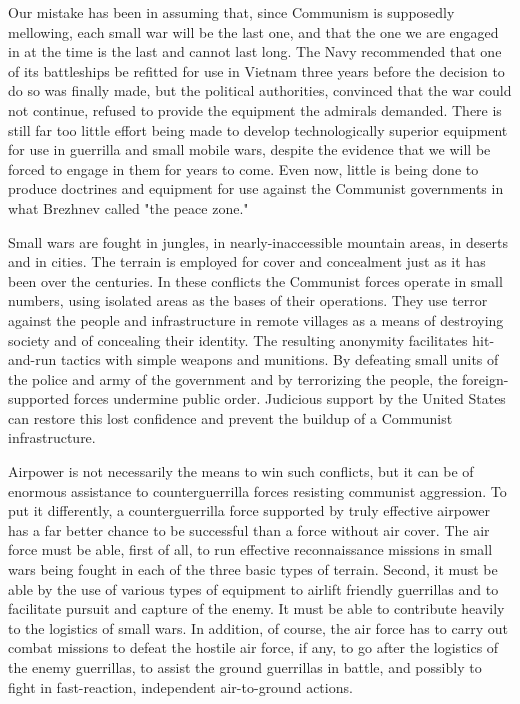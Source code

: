 Our mistake has been in assuming that, since Communism is supposedly mellowing, each small war will be the last one, and that the one we are engaged in at the time is the last and cannot last long. The Navy recommended that one of its battleships be refitted for use in Vietnam three years before the decision to do so was finally made, but the political authorities, convinced that the war could not continue, refused to provide the equipment the admirals demanded. There is still far too little effort being made to develop technologically superior equipment for use in guerrilla and small mobile wars, despite the evidence that we will be forced to engage in them for years to come. Even now, little is being done to produce doctrines and equipment for use against the Communist governments in what Brezhnev called "the peace zone."

Small wars are fought in jungles, in nearly-inaccessible mountain areas, in deserts and in cities. The terrain is employed for cover and concealment just as it has been over the centuries. In these conflicts the Communist forces operate in small numbers, using isolated areas as the bases of their operations. They use terror against the people and infrastructure in remote villages as a means of destroying society and of concealing their identity. The resulting anonymity facilitates hit-and-run tactics with simple weapons and munitions. By defeating small units of the police and army of the government and by terrorizing the people, the foreign-supported forces undermine public order. Judicious support by the United States can restore this lost confidence and prevent the buildup of a Communist infrastructure.

Airpower is not necessarily the means to win such conflicts, but it can be of enormous assistance to counterguerrilla forces resisting communist aggression. To put it differently, a counterguerrilla force supported by truly effective airpower has a far better chance to be successful than a force without air cover. The air force must be able, first of all, to run effective reconnaissance missions in small wars being fought in each of the three basic types of terrain. Second, it must be able by the use of various types of equipment to airlift friendly guerrillas and to facilitate pursuit and capture of the enemy. It must be able to contribute heavily to the logistics of small wars. In addition, of course, the air force has to carry out combat missions to defeat the hostile air force, if any, to go after the logistics of the enemy guerrillas, to assist the ground guerrillas in battle, and possibly to fight in fast-reaction, independent air-to-ground actions.

